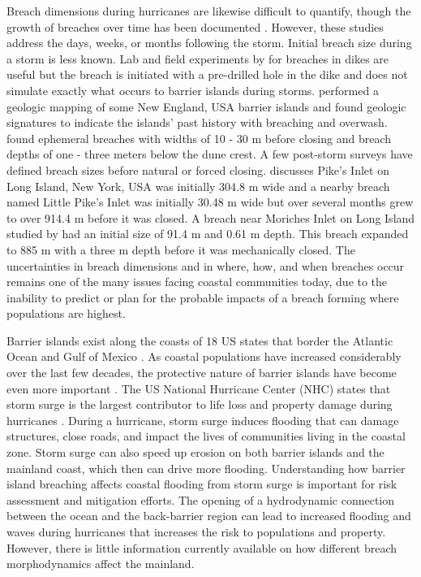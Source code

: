 \documentclass{coastal_paper}
\begin{document}
Breach dimensions during hurricanes are likewise difficult to quantify, though the growth of breaches over time has been documented \citep{kraus2003coastal, schmeltz1982breach}. However, these studies address the days, weeks, or months following the storm. Initial breach size during a storm is less known. Lab and field experiments by \citet{visser1999breach} for breaches in dikes are useful but the breach is initiated with a pre-drilled hole in the dike and does not simulate exactly what occurs to barrier islands during storms. \citet{buynevich2006geological} performed a geologic mapping of some New England, USA barrier islands and found geologic signatures to indicate the islands' past history with breaching and overwash. \citet{buynevich2006geological} found ephemeral breaches with widths of 10 - 30 m before closing and breach depths of one - three meters below the dune crest. A few post-storm surveys have defined breach sizes before natural or forced closing. \cite{kraus2003coastal} discusses Pike's Inlet on Long Island, New York, USA was initially 304.8 m wide and a nearby breach named Little Pike's Inlet was initially 30.48 m wide but over several months grew to over 914.4 m before it was closed. A breach near Moriches Inlet on Long Island studied by \cite{schmeltz1982breach} had an initial size of 91.4 m and 0.61 m depth. This breach expanded to 885 m with a three m depth before it was mechanically closed. The uncertainties in breach dimensions and  in where, how, and when breaches occur remains one of the many issues facing coastal communities today, due to the inability to predict or plan for the probable impacts of a breach forming where populations are highest. 

Barrier islands exist along the coasts of 18 US states that border the Atlantic Ocean and Gulf of Mexico \citep{zhang2011barrier}. As coastal populations have increased considerably over the last few decades, the protective nature of barrier islands have become even more important \citep{zhang2011barrier}. The US National Hurricane Center (NHC) states that storm surge  is the largest contributor to life loss and property damage during hurricanes \citep{Center2006}. During a hurricane, storm surge induces flooding that can damage structures, close roads, and impact the lives of communities living in the coastal zone. Storm surge can also speed up erosion on both barrier islands and the mainland coast, which then can drive more flooding. Understanding how barrier island breaching affects coastal flooding from storm surge is important for risk assessment and mitigation efforts. The opening of a hydrodynamic connection between the ocean and the back-barrier region can lead to increased flooding and waves during hurricanes that increases the risk to populations and property. However, there is little information currently available on how different breach morphodynamics affect the mainland.
\end{document}
